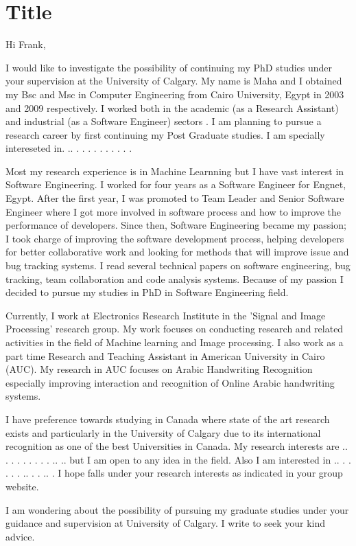 \documentclass{article}
\begin{document}
\section{Title}

Hi Frank,

I would like to  investigate the possibility of continuing my PhD studies under
your supervision at the University of Calgary.  My name is Maha and I obtained
my Bsc and Msc in Computer Engineering from  Cairo University, Egypt in  2003
and 2009 respectively.  I worked both in the academic (as a Research Assistant)
and industrial (as a Software Engineer) sectors . I am planning to pursue a
research career by first continuing my Post Graduate studies. I am specially
intereseted in. ..  .  .  .  .   .  .  .  .  .  .

Most my research experience is in Machine Learnning but I have vast interest in
Software Engineering. I worked for four years as a Software Engineer for Engnet,
Egypt. After the first year, I was promoted to Team Leader and Senior Software
Engineer where I got more involved in software process and how to improve the
performance of developers. Since then, Software Engineering became my passion;
I took charge of improving the software development process,
helping developers for better collaborative work and looking for methods that will improve issue and bug tracking systems.
     I read  several  technical papers on software engineering, bug tracking,
     team collaboration and code analysis systems.  Because of my passion I
     decided to pursue my studies in PhD in Software Engineering field.


Currently, I work at Electronics Research Institute in the 'Signal and Image
Processing' research group. My work focuses on conducting research and related activities in the field of Machine learning and Image processing. I also work as a part time Research and Teaching Assistant in American University in Cairo (AUC).
  My research in AUC focuses on Arabic Handwriting Recognition especially improving interaction and recognition of Online Arabic handwriting systems.


     I have preference towards studying in Canada where state of the art
     research exists and particularly in the University of Calgary due to its
     international recognition as one of the best Universities in Canada. My
     research interests are   ..     .  .  .  .  . .  .  . .. .. but I am open
     to any idea in the field. Also I am interested in .. . .   .  . . .. . . .. .
     I hope falls under your research interests as indicated in your
     group website.

I am wondering about the possibility of pursuing my graduate studies under your
guidance and supervision at University of Calgary. I
write to seek your kind advice.
\end{document}

